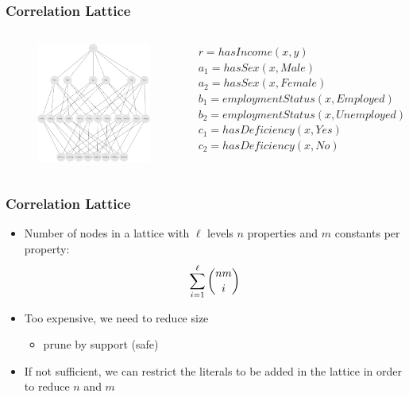 \documentclass{beamer}
\begin{document}
\begin{frame}
 \frametitle{Correlation Lattice}
 \begin{columns}[c]
    \begin{figure}
     \label{lattice}
      \includegraphics[height=0.7\textheight]{./Figures/lattice}
    \end{figure}
    \fontsize{7}{7}
    $r=hasIncome(x,y)$ \\
    $a_1=hasSex(x,Male)$ \\
    $a_2=hasSex(x,Female)$ \\
    $b_1=employmentStatus(x,Employed)$ \\
    $b_2=employmentStatus(x,Unemployed)$ \\
    $c_1=hasDeficiency(x,Yes)$ \\
    $c_2=hasDeficiency(x,No)$ \\
 \end{columns}
\end{frame}


\begin{frame}
\frametitle{Correlation Lattice}
  \begin{itemize}
     \item Number of nodes in a lattice with $\ell$ levels $n$ properties and $m$ constants per property:
      \begin{equation}
	\sum_{i=1}^{\ell} \dbinom{nm}{i}
      \end{equation}
      \item Too expensive, we need to reduce size 
      \begin{itemize}
	\item prune by support (safe)
      \end{itemize}
      \item If not sufficient, we can restrict the literals to be added in the lattice in order to reduce $n$ and $m$
  \end{itemize}
\end{frame}
\end{document}
